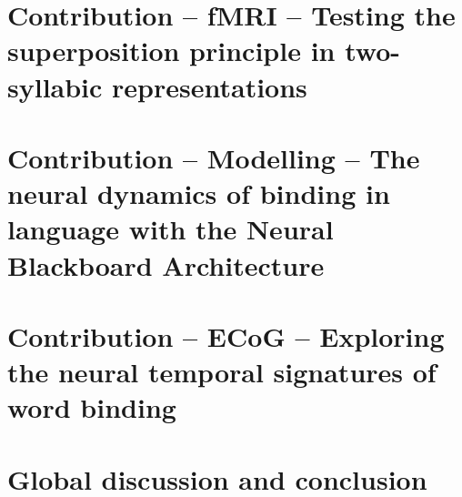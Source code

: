 \documentclass[twoside, justified, notoc, nobib, 
	nohyper]{tufte-book}
\begin{document}
\part{Contribution -- fMRI -- Testing the superposition principle in two-syllabic representations}
\cleardoublepage

\FloatBarrier

\FloatBarrier

\FloatBarrier

\FloatBarrier

\part{Contribution -- Modelling -- The neural dynamics of binding in language with the Neural Blackboard Architecture}
\cleardoublepage
% 
% 
% 
% 


\part{Contribution -- ECoG -- Exploring the neural temporal signatures of word binding}
\cleardoublepage
% 
% 
% 
% 


\part{Global discussion and conclusion}
\cleardoublepage
%
%
\cleardoublepage


\backmatter 



\clearpage
%
\end{document}
